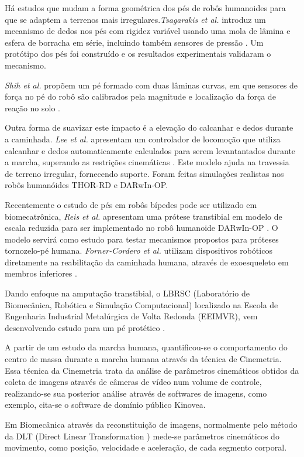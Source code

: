 Há estudos que  mudam a forma geométrica dos pés de robôs humanoides para que se adaptem a terrenos mais irregulares.\textit{Tsagarakis et al.} introduz um mecanismo de dedos nos pés com rigidez variável usando uma mola de lâmina e esfera de borracha em série, incluindo também sensores de pressão \cite{hertz2016} . Um protótipo dos pés foi construído e os resultados experimentais validaram o mecanismo.

\textit{Shih et al.}  propõem um pé formado com duas lâminas curvas, em que sensores de força no pé do robô são calibrados pela magnitude e localização da força de reação no solo \cite{curvo20017}.

Outra forma de suavizar este impacto é  a elevação do calcanhar e dedos durante a caminhada. \textit{Lee et al.} apresentam um controlador de locomoção que utiliza calcanhar e dedos automaticamente calculados para serem levantantados durante a marcha, superando as restrições cinemáticas \cite{movi2016}.  Este modelo ajuda na travessia de terreno irregular, fornecendo suporte. Foram feitas simulações realistas nos robôs humanóides THOR-RD e DARwIn-OP.

Recentemente o estudo de pés em robôs bípedes pode ser utilizado em biomecatrônica, \textit{Reis et al.} apresentam uma prótese transtibial em  modelo de escala reduzida para ser implementado no robô humanoide DARwIn-OP \cite{protese2017}. O modelo servirá como estudo para testar mecanismos propostos para próteses tornozelo-pé humana. \textit{Forner-Cordero et al.}  utilizam dispositivos robóticos diretamente na reabilitação da caminhada humana, através de exoesqueleto em membros inferiores \cite{fornero2009}.

Dando enfoque na amputação transtibial, o LBRSC (Laboratório de Biomecânica, Robótica e Simulação Computacional) localizado na Escola de Engenharia Industrial Metalúrgica de Volta Redonda (EEIMVR), vem desenvolvendo estudo para um  pé protético \cite{luciana2017}. 

A partir de um estudo da marcha humana, quantificou-se o comportamento do centro de massa durante a marcha humana através da técnica de Cinemetria. Essa técnica da Cinemetria trata da análise de parâmetros cinemáticos obtidos da coleta de imagens através de câmeras de vídeo num volume de controle, realizando-se sua posterior análise através de softwares de imagens, como exemplo, cita-se o software de domínio público Kinovea\cite{cinemetria2017}. 

Em Biomecânica através da reconstituição de imagens, normalmente pelo método da DLT (Direct Linear Transformation \cite{dlt2011}) mede-se parâmetros cinemáticos do movimento, como posição, velocidade e aceleração, de cada segmento corporal. 

